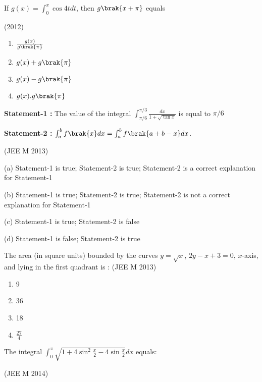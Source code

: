 	\item If $g(x)=\int_0^x\cos 4t dt$, then $g\brak{x+\pi}$ equals

		\hfill{(2012)}

		\begin{multicols}{2}
			\begin{enumerate}[label=(\alph*)]
				\item $\frac{g(x)}{g\brak{\pi}}$
				\item $g(x)+g\brak{\pi}$
				\item $g(x)-g\brak{\pi}$
				\item $g(x).g\brak{\pi}$
			\end{enumerate}
		\end{multicols}

	\item \textbf{Statement-1 :} The value of the integral $\int_{\pi/6}^{\pi/3}\frac{dx}{1+\sqrt{\tan x}}$ is equal to $\pi/6$

		\textbf{Statement-2 :} $\int_a^bf\brak{x}dx=\int_a^bf\brak{a+b-x}dx$.

		\hfill{(JEE M 2013)}
		
		(a) Statement-1 is true; Statement-2 is true; Statement-2 is a correct explanation for Statement-1

		(b) Statement-1 is true; Statement-2 is true; Statement-2 is not a correct explanation for Statement-1

		(c) Statement-1 is true; Statement-2 is false

		(d) Statement-1 is false; Statement-2 is true

	\item The area (in square units) bounded by the curves $y=\sqrt{x}$, $2y-x+3=0$, $x$-axis, and lying in the first quadrant is :
		\hfill{(JEE M 2013)}

		\begin{multicols}{4}
			\begin{enumerate}
		\item 9
		\item 36
		\item 18
		\item $\frac{27}{4}$
			\end{enumerate}
		\end{multicols}


	\item The integral $\int_0^{\pi}\sqrt{1+4\sin ^2\frac{x}{2}-4\sin \frac{x}{2}}dx$ equals:

		\hfill{(JEE M 2014)}

